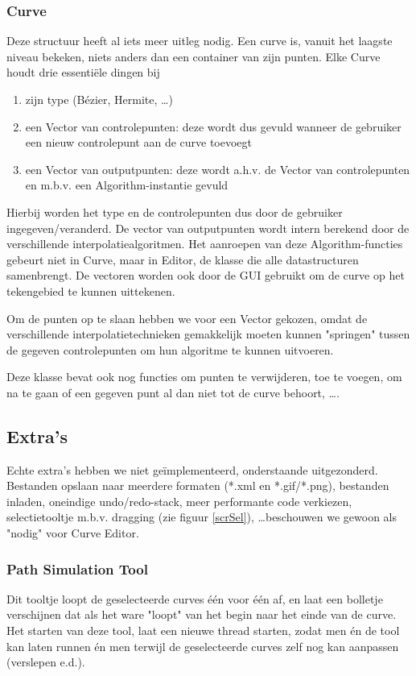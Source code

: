 \documentclass[a4paper,11pt,oneside, titlepage]{article}
\begin{document}
\subsubsection{Curve}
Deze structuur heeft al iets meer uitleg nodig. Een curve is, vanuit het laagste niveau bekeken, niets 
anders dan een container van zijn punten.\newline
Elke Curve houdt drie essenti\"ele dingen bij
\begin{enumerate}
\item zijn type (B\'ezier, Hermite, \ldots)
\item een Vector van controlepunten: deze wordt dus gevuld wanneer de gebruiker een nieuw controlepunt aan de curve toevoegt
\item een Vector van outputpunten: deze wordt a.h.v. de Vector van controlepunten en m.b.v. een Algorithm-instantie gevuld
\end{enumerate}

Hierbij worden het type en de controlepunten dus door de gebruiker ingegeven/veranderd. De vector van outputpunten
wordt intern berekend door de verschillende interpolatiealgoritmen. Het aanroepen van deze Algorithm-functies gebeurt niet in Curve, maar in Editor, de klasse die alle datastructuren samenbrengt.
De vectoren worden ook door de GUI gebruikt om de curve op het tekengebied te kunnen uittekenen.\newline

Om de punten op te slaan hebben we voor een Vector gekozen, omdat de verschillende
interpolatietechnieken gemakkelijk moeten kunnen "springen" tussen de gegeven controlepunten om
hun algoritme te kunnen uitvoeren.

Deze klasse bevat ook nog functies om punten te verwijderen, toe te voegen, om na te gaan of een gegeven punt al dan niet tot de curve behoort, \ldots.
\subsection{Extra's}
Echte extra's hebben we niet ge\"implementeerd, onderstaande uitgezonderd. Bestanden opslaan naar meerdere formaten (*.xml en *.gif/*.png), bestanden inladen, oneindige undo/redo-stack, meer performante code verkiezen, selectietooltje m.b.v. dragging (zie figuur \ref{scrSel}), \ldots beschouwen we gewoon als "nodig" voor Curve Editor.
\subsubsection{Path Simulation Tool}
Dit tooltje loopt de geselecteerde curves \'e\'en voor \'e\'en af, en laat een bolletje verschijnen dat als het ware "loopt" van het begin naar het einde van de curve. Het starten van deze tool, laat een nieuwe thread starten, zodat men \'en de tool kan laten runnen \'en men terwijl de geselecteerde curves zelf nog kan aanpassen (verslepen e.d.). 
\end{document}
